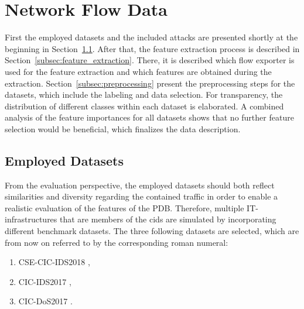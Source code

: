 \documentclass[../../main.tex]{subfiles}
\begin{document}
\section{Network Flow Data}\label{sec:network_flow_data}
First the employed datasets and the included attacks are presented shortly at the beginning in Section~\ref{subsec:employed_datasets}. After that, the feature extraction process is described in Section~\ref{subsec:feature_extraction}. There, it is described which flow exporter is used for the feature extraction and which features are obtained during the extraction. Section~\ref{subsec:preprocessing} present the preprocessing steps for the datasets, which include the labeling and data selection. For transparency, the distribution of different classes within each dataset is elaborated. A combined analysis of the feature importances for all datasets shows that no further feature selection would be beneficial, which finalizes the data description.

\subsection{Employed Datasets}\label{subsec:employed_datasets}

From the evaluation perspective, the employed datasets should both reflect similarities and diversity regarding the contained traffic in order to enable a realistic evaluation of the features of the PDB. Therefore, multiple IT-infrastructures that are members of the \gls{cids} are simulated by incorporating different benchmark datasets. The three following datasets are selected, which are from now on referred to by the corresponding roman numeral:

\begin{enumerate}
    \item[\RomanNumeralCaps{1}] CSE-CIC-IDS2018 \cite{cse-cic-ids-2018},
    \item[\RomanNumeralCaps{2}] CIC-IDS2017 \cite{sharafaldin_toward_2018},
    \item[\RomanNumeralCaps{3}] CIC-DoS2017 \cite{jazi2017detecting}.
\end{enumerate}
\end{document}
